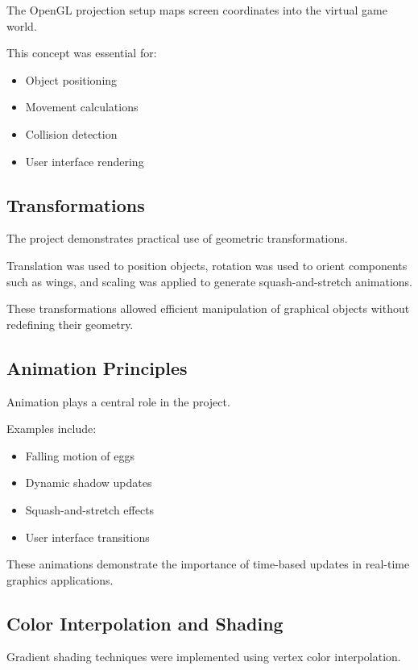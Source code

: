\documentclass[12pt,a4paper]{report}
\begin{document}
The OpenGL projection setup maps screen coordinates into the virtual game world.

This concept was essential for:

\begin{itemize}
\item Object positioning
\item Movement calculations
\item Collision detection
\item User interface rendering
\end{itemize}

\subsection*{Transformations}

The project demonstrates practical use of geometric transformations.

Translation was used to position objects, rotation was used to orient components such as wings, and scaling was applied to generate squash-and-stretch animations.

These transformations allowed efficient manipulation of graphical objects without redefining their geometry.

\subsection*{Animation Principles}

Animation plays a central role in the project.

Examples include:

\begin{itemize}
\item Falling motion of eggs
\item Dynamic shadow updates
\item Squash-and-stretch effects
\item User interface transitions
\end{itemize}

These animations demonstrate the importance of time-based updates in real-time graphics applications.

\subsection*{Color Interpolation and Shading}

Gradient shading techniques were implemented using vertex color interpolation.
\end{document}
